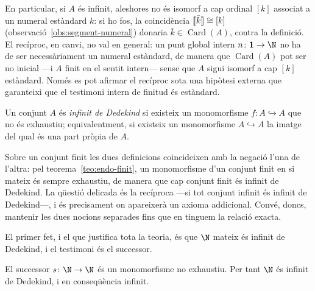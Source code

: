 \begin{observacio}\label{obs:infinit-numeral}
En particular, si \(A\) és infinit, aleshores no és isomorf a cap ordinal
\([k]\) associat a un numeral estàndard \(k\): si ho fos, la coincidència
\(\llbracket \bar k\rrbracket\cong[k]\) (observació~\ref{obs:segment-numeral}) donaria
\(\bar k\in\operatorname{Card}(A)\), contra la definició. El recíproc, en
canvi, no val en general: un punt global intern \(n\colon\mathbf1\to\N\)
no ha de ser necessàriament un numeral estàndard, de manera que
\(\operatorname{Card}(A)\) pot ser no inicial ---i \(A\) finit en el sentit
intern--- sense que \(A\) sigui isomorf a cap \([k]\) estàndard. Només es
pot afirmar el recíproc sota una hipòtesi externa que garanteixi que el
testimoni intern de finitud és estàndard.
\end{observacio}

\begin{definicio}\label{def:dedekind-infinit}
Un conjunt \(A\) és \emph{infinit de Dedekind} si existeix un monomorfisme
\(f\colon A\hookrightarrow A\) que no és exhaustiu; equivalentment, si
existeix un monomorfisme \(A\hookrightarrow A\) la imatge del qual és una
part pròpia de \(A\).
\end{definicio}

\begin{observacio}\label{obs:dues-infinituds}
Sobre un conjunt finit les dues definicions coincideixen amb la negació
l'una de l'altra: pel teorema~\ref{teo:endo-finit}, un monomorfisme d'un
conjunt finit en si mateix és sempre exhaustiu, de manera que cap conjunt
finit és infinit de Dedekind. La qüestió delicada és la recíproca ---si
tot conjunt infinit és infinit de Dedekind---, i és precisament on
apareixerà un axioma addicional. Convé, doncs, mantenir les dues nocions
separades fins que en tinguem la relació exacta.
\end{observacio}

El primer fet, i el que justifica tota la teoria, és que \(\N\) mateix és
infinit de Dedekind, i el testimoni és el successor.

\begin{proposicio}\label{prop:N-dedekind}
El successor \(s\colon\N\to\N\) és un monomorfisme no exhaustiu. Per tant
\(\N\) és infinit de Dedekind, i en conseqüència infinit.
\end{proposicio}

